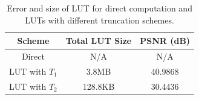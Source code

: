 \documentclass[12pt]{amsart}
\theoremstyle{definition}
\theoremstyle{remark}
\numberwithin{thm}{section}
\begin{document}
\begin{center}
\begin{table}
	 
    \begin{tabular}{ | c | c| c |}
    \hline
    Scheme & Total LUT Size & PSNR (dB) \\ \hline
    Direct & N/A & N/A  \\ \hline
    LUT with $T_1$ & 3.8MB & 40.9868 \\ \hline
    LUT with $T_2$ & 128.8KB & 30.4436 \\ \hline   
    \end{tabular}
    \bigskip
    
    \caption{Error and size of LUT for direct computation and LUTs with different truncation schemes.}
     \label{tbl:high_pass}
\end{table}
\end{center}
\end{document}
